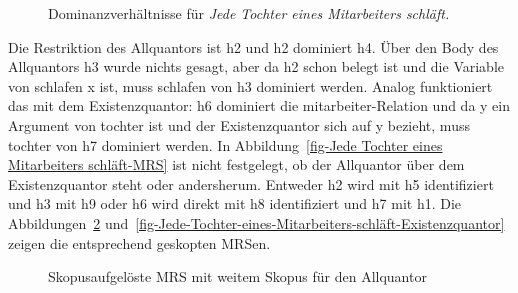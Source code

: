 \begin{figure}
\caption{Dominanzverhältnisse für \emph{Jede Tochter eines Mitarbeiters schläft.}}\label{fig-Jede Tochter eines Mitarbeiters schläft-MRS}
\end{figure}
Die Restriktion des Allquantors ist h2 und h2 dominiert h4. Über den Body des Allquantors h3 wurde
nichts gesagt, aber da h2 schon belegt ist und die Variable von schlafen x ist, muss schlafen von h3
dominiert werden. Analog funktioniert das mit dem Existenzquantor: h6 dominiert die
mitarbeiter-Relation und da y ein Argument von tochter ist und der Existenzquantor sich auf y
bezieht, muss tochter von h7 dominiert werden. In Abbildung~\ref{fig-Jede Tochter eines Mitarbeiters
  schläft-MRS} ist nicht festgelegt, ob der Allquantor über dem Existenzquantor steht oder
andersherum. Entweder h2 wird mit h5
identifiziert und h3 mit h9 oder h6 wird direkt mit h8 identifiziert und h7 mit h1. Die Abbildungen~\ref{fig-Jede-Tochter-eines-Mitarbeiters-schläft-Allquantor} und~\ref{fig-Jede-Tochter-eines-Mitarbeiters-schläft-Existenzquantor} zeigen die entsprechend geskopten MRSen.
\begin{figure}
\caption{Skopusaufgelöste MRS mit weitem Skopus für den Allquantor}\label{fig-Jede-Tochter-eines-Mitarbeiters-schläft-Allquantor}
\end{figure}
